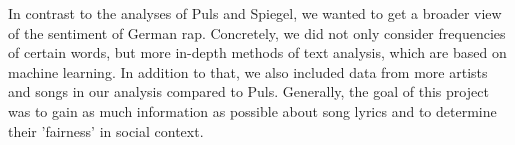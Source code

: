In contrast to the analyses of Puls and Spiegel, we wanted to get a broader view of the sentiment of German rap. Concretely, we did not only consider frequencies of certain words, but more in-depth methods of text analysis, which are based on machine learning. In addition to that, we also included data from more artists and songs in our analysis compared to Puls. Generally, the goal of this project was to gain as much information as possible about song lyrics and to determine their 'fairness' in social context.












